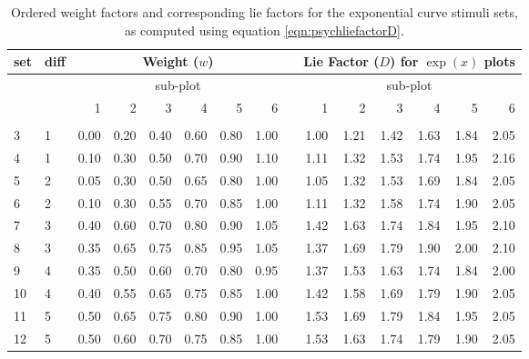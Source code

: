\documentclass[11pt]{isuthesis}\usepackage[]{graphicx}\usepackage[]{color}
\begin{document}
\begin{table}[ht]
\centering
\caption[Weight factor and lie factors for exponential stimuli]{\label{tab:w2} Ordered weight factors and corresponding lie factors for the exponential curve stimuli sets, as computed using equation \ref{eqn:psychliefactorD}.}
     \begin{tabular}{llrrrrrrlrrrrrr}
     \hline
     set\vphantom{hp}& diff & \multicolumn{6}{c}{Weight ($w$)} & & \multicolumn{6}{c}{Lie Factor ($D$) for $\exp(x)$ plots}\\ 
     \hline
     & & \multicolumn{6}{c}{sub-plot} & & \multicolumn{6}{c}{sub-plot}\\ 
     & & 1 & 2 & 3 & 4 & 5 & 6  & & 1 & 2 & 3 & 4 & 5 & 6  \\ 
     \cline{3-8} \cline{10-15}\\ [-1.75ex]
     3 & 1 & 0.00 & 0.20 & 0.40 & 0.60 & 0.80 & 1.00 &  & 1.00 & 1.21 & 1.42 & 1.63 & 1.84 & 2.05 \\ 
     4 & 1 & 0.10 & 0.30 & 0.50 & 0.70 & 0.90 & 1.10 &  & 1.11 & 1.32 & 1.53 & 1.74 & 1.95 & 2.16 \\ 
     5 & 2 & 0.05 & 0.30 & 0.50 & 0.65 & 0.80 & 1.00 &  & 1.05 & 1.32 & 1.53 & 1.69 & 1.84 & 2.05 \\ 
     6 & 2 & 0.10 & 0.30 & 0.55 & 0.70 & 0.85 & 1.00 &  & 1.11 & 1.32 & 1.58 & 1.74 & 1.90 & 2.05 \\ 
     7 & 3 & 0.40 & 0.60 & 0.70 & 0.80 & 0.90 & 1.05 &  & 1.42 & 1.63 & 1.74 & 1.84 & 1.95 & 2.10 \\ 
     8 & 3 & 0.35 & 0.65 & 0.75 & 0.85 & 0.95 & 1.05 &  & 1.37 & 1.69 & 1.79 & 1.90 & 2.00 & 2.10 \\ 
     9 & 4 & 0.35 & 0.50 & 0.60 & 0.70 & 0.80 & 0.95 &  & 1.37 & 1.53 & 1.63 & 1.74 & 1.84 & 2.00 \\ 
     10 & 4 & 0.40 & 0.55 & 0.65 & 0.75 & 0.85 & 1.00 &  & 1.42 & 1.58 & 1.69 & 1.79 & 1.90 & 2.05 \\ 
     11 & 5 & 0.50 & 0.65 & 0.75 & 0.80 & 0.90 & 1.00 &  & 1.53 & 1.69 & 1.79 & 1.84 & 1.95 & 2.05 \\ 
     12 & 5 & 0.50 & 0.60 & 0.70 & 0.75 & 0.85 & 1.00 &  & 1.53 & 1.63 & 1.74 & 1.79 & 1.90 & 2.05 \\ 
     \hline
  \end{tabular}
\end{table}
\end{document}
